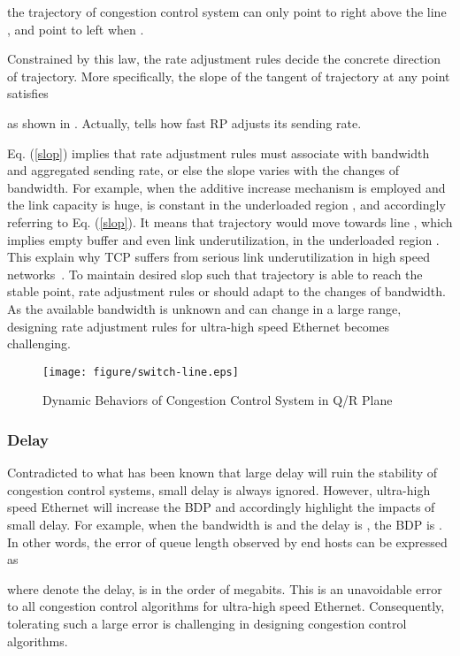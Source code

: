 \documentclass{sig-alternate-10pt}
\begin{document}
the trajectory of congestion control system can only point to right above the line , and point to left when . 

Constrained by this law, the rate adjustment rules decide the concrete direction of trajectory. More specifically, the slope  of the tangent of trajectory at any point  satisfies 

as shown in . Actually,  tells how fast RP adjusts its sending rate.


Eq. (\ref{slop}) implies that rate adjustment rules must associate with bandwidth and aggregated sending rate, or else the slope  varies with the changes of bandwidth. For example, when the additive increase mechanism is employed and the link capacity is huge,  is constant in the underloaded region , and accordingly  referring to Eq. (\ref{slop}). It means that trajectory would move towards line , which implies empty buffer and even link underutilization, in the underloaded region . This explain why TCP suffers from serious link underutilization in high speed networks~\cite{HS-TCP}. To maintain desired slop  such that trajectory is able to reach the stable point, rate adjustment rules or  should adapt to the changes of bandwidth. As the available bandwidth is unknown and can change in a large range, designing rate adjustment rules for ultra-high speed Ethernet becomes challenging.


\begin{figure}
\centering
\texttt{[image: figure/switch-line.eps]}
\caption{Dynamic Behaviors of Congestion Control System in Q/R Plane}
\label{switch-line}
\end{figure}


\subsubsection{Delay}
Contradicted to what has been known that large delay will ruin the stability of congestion control systems, small delay is always ignored. However, ultra-high speed Ethernet will increase the BDP and accordingly highlight the impacts of small delay. For example, when the bandwidth is  and the delay is , the BDP is . In other words, the error  of queue length observed by end hosts can be expressed as

where  denote the delay, is in the order of megabits. This is an unavoidable error to all congestion control algorithms for ultra-high speed Ethernet. Consequently, tolerating such a large error is challenging in designing congestion control algorithms. 
\end{document}
